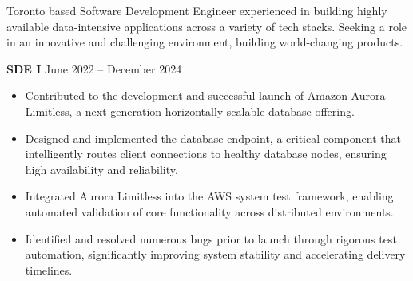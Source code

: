 \documentclass[10pt,a4paper]{altacv}
\begin{document}

\begin{fullwidth}
    \makecvheader
    Toronto based Software Development Engineer experienced in building highly available data-intensive applications across a variety of tech stacks. Seeking a role in an innovative and challenging environment, building world-changing products.
\end{fullwidth}


\vspace{-0.25em}
\textbf{\color{accent}SDE I}
\hfill\small\faCalendar\hspace{0.5em}June 2022 -- December 2024
\normalsize
\medskip
\begin{itemize}
    \item Contributed to the development and successful launch of Amazon Aurora Limitless, a next-generation horizontally scalable database offering.
    \item Designed and implemented the database endpoint, a critical component that intelligently routes client connections to healthy database nodes, ensuring high availability and reliability.
    \item Integrated Aurora Limitless into the AWS system test framework, enabling automated validation of core functionality across distributed environments.
    \item Identified and resolved numerous bugs prior to launch through rigorous test automation, significantly improving system stability and accelerating delivery timelines.
\end{itemize}

\divider
\end{document}
